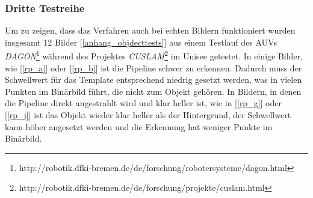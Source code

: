 \subsubsection*{Dritte Testreihe}
Um zu zeigen, dass das Verfahren auch bei echten Bildern funktioniert wurden insgesamt 12 Bilder [\ref{anhang_objdecttests}] aus einem Testlauf des AUVs \textit{DAGON}\footnote{http://robotik.dfki-bremen.de/de/forschung/robotersysteme/dagon.html} während des Projektes \textit{CUSLAM}\footnote{http://robotik.dfki-bremen.de/de/forschung/projekte/cuslam.html} im Unisee getestet. In einige Bilder, wie [\ref{rp_a}] oder [\ref{rp_b}] ist die Pipeline schwer zu erkennen. Dadurch muss der Schwellwert für das Template entsprechend niedrig gesetzt werden, was in vielen Punkten im Binärbild führt, die nicht zum Objekt gehören. In Bildern, in denen die Pipeline direkt angestrahlt wird und klar heller ist, wie in [\ref{rp_g}] oder [\ref{rp_j}] ist das Objekt wieder klar heller als der Hintergrund, der Schwellwert kann höher angesetzt werden und die Erkennung hat weniger Punkte im Binärbild.
